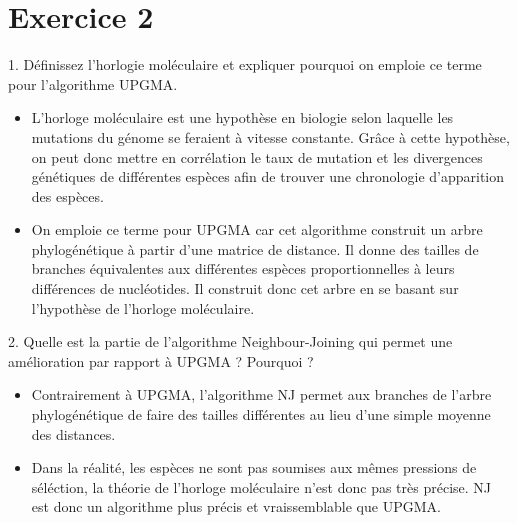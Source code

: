 \documentclass[
	12pt, %
]{fphw}
\begin{document}

\section*{Exercice 2}

\begin{problem}
	1. Définissez l'horlogie moléculaire et expliquer pourquoi on emploie ce terme pour l'algorithme UPGMA.
\end{problem}
\begin{center}
	\begin{itemize}
		\item L'horloge moléculaire est une hypothèse en biologie selon laquelle les mutations du génome se feraient à vitesse constante. Grâce à cette hypothèse, on peut donc mettre en corrélation le taux de mutation et les divergences génétiques de différentes espèces afin de trouver une chronologie d'apparition des espèces.
		\item On emploie ce terme pour UPGMA car cet algorithme construit un arbre phylogénétique à partir d'une matrice de distance. Il donne des tailles de branches équivalentes aux différentes espèces proportionnelles à leurs différences de nucléotides. Il construit donc cet arbre en se basant sur l'hypothèse de l'horloge moléculaire.
	\end{itemize}
\end{center}

\begin{problem}
	2. Quelle est la partie de l'algorithme Neighbour-Joining qui permet une amélioration par rapport à UPGMA ? Pourquoi ?
\end{problem}
\begin{center}
	\begin{itemize}
		\item Contrairement à UPGMA, l'algorithme NJ permet aux branches de l'arbre phylogénétique de faire des tailles différentes au lieu d'une simple moyenne des distances. 
		\item Dans la réalité, les espèces ne sont pas soumises aux mêmes pressions de séléction, la théorie de l'horloge moléculaire n'est donc pas très précise. NJ est donc un algorithme plus précis et vraissemblable que UPGMA.
	\end{itemize}
\end{center}
\end{document}

